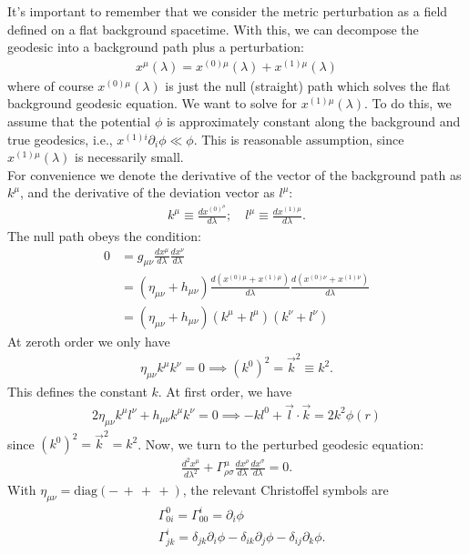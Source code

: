 \documentclass{book}
\theoremstyle{definition}
\newcommand{\p}{\partial}
\newcommand{\nn}{\nonumber}
\newcommand{\f}[2]{\frac{#1}{#2}}
\newcommand{\lp}{\left(}
\newcommand{\rp}{\right)}
\begin{document}
It's important to remember that we consider the metric perturbation as a field defined on a flat background spacetime. With this, we can decompose the geodesic into a background path plus a perturbation:
\begin{align}
x^\mu(\lambda) = x^{(0)\mu}(\lambda) + x^{(1)\mu}(\lambda)
\end{align}
where of course $x^{(0)\mu}(\lambda)$ is just the null (straight) path which solves the flat background geodesic equation. We want to solve for $x^{(1)\mu}(\lambda)$. To do this, we assume that the potential $\phi$ is approximately constant along the background and true geodesics, i.e., $x^{(1)i}\p_i \phi \ll \phi$. This is reasonable assumption, since $x^{(1)\mu}(\lambda)$ is necessarily small. \\

For convenience we denote the derivative of the vector of the background path as $k^\mu$, and the derivative of the deviation vector as $l^\mu$:
\begin{align}
k^\mu \equiv \f{dx^(0)^\mu}{d\lambda}; \quad l^\mu \equiv \f{dx^{(1)\mu}}{d\lambda}.
\end{align}
The null path obeys the condition:
\begin{align}\label{null}
0 &= g_{\mu\nu}\f{dx^\mu}{d\lambda}\f{dx^\nu}{d\lambda}\nn\\
&= \lp \eta_{\mu\nu} + h_{\mu\nu} \rp\f{d\lp x^{(0)\mu} + x^{(1)\mu} \rp}{d\lambda}\f{d\lp x^{(0)\nu} + x^{(1)\nu} \rp}{d\lambda}\nn\\
&= \boxed{\lp \eta_{\mu\nu} + h_{\mu\nu} \rp(k^\mu + l^\mu)(k^\nu + l^\nu)}
\end{align}
At zeroth order we only have 
\begin{align}
\eta_{\mu\nu}k^\mu k^\nu = 0 \implies {\lp k^0\rp}^2 = \vec{k}^2 \equiv k^2.
\end{align}
This defines the constant $k$. At first order, we have
\begin{align}\label{orth}
2\eta_{\mu\nu}k^\mu l^\nu + h_{\mu\nu}k^\mu k^\nu = 0 \implies \boxed{-kl^0 + \vec{l}\cdot \vec{k} = 2k^2 \phi(r)}
\end{align}
since $\lp k^0\rp^2 = \vec{k}^2 = k^2$. Now, we turn to the perturbed geodesic equation:
\begin{align}
\f{d^2 x^\mu}{d\lambda^2} + \Gamma^\mu_{\rho\sigma}\f{dx^\rho}{d\lambda}\f{dx^\sigma}{d\lambda} = 0.
\end{align}
With $\eta_{\mu\nu} = \text{diag}(-\,+\,+\,+)$, the relevant Christoffel symbols are
\begin{align}
&\Gamma^0_{0i} = \Gamma^i_{00} = \p_i \phi\nn\\
&\Gamma^i_{jk} = \delta_{jk}\p_i \phi - \delta_{ik}\p_j\phi - \delta_{ij}\p_k \phi.
\end{align}
\end{document}
